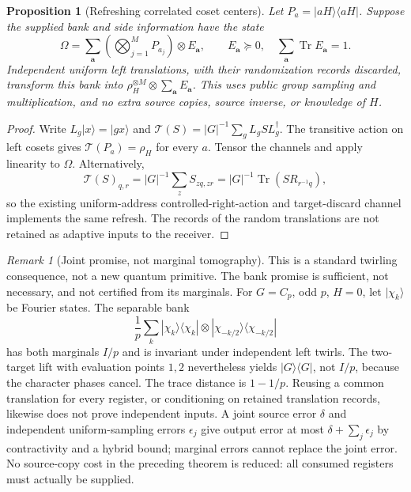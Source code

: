 \documentclass[11pt]{article}
\newtheorem{proposition}[theorem]{Proposition}
\theoremstyle{remark}
\newtheorem{remark}[theorem]{Remark}
\newcommand{\tr}{\operatorname{Tr}}
\begin{document}
\begin{proposition}[Refreshing correlated coset centers]
Let $P_a=|aH\rangle\langle aH|$. Suppose the supplied bank and side
information have the state
\[
 \Omega=\sum_{\mathbf a}\left(\bigotimes_{j=1}^M P_{a_j}\right)
               \otimes E_{\mathbf a},\qquad
 E_{\mathbf a}\succeq0,\quad\sum_{\mathbf a}\tr E_{\mathbf a}=1.
\]
Independent uniform left translations, with their randomization records
discarded, transform this bank into
$\rho_H^{\otimes M}\otimes\sum_{\mathbf a}E_{\mathbf a}$.
This uses public group sampling and multiplication, and no extra source
copies, source inverse, or knowledge of $H$.
\end{proposition}
\begin{proof}
Write $L_g|x\rangle=|gx\rangle$ and
$\mathcal T(S)=|G|^{-1}\sum_gL_gSL_g^\dagger$.
The transitive action on left cosets gives $\mathcal T(P_a)=\rho_H$
for every $a$. Tensor the channels and apply linearity to $\Omega$.
Alternatively,
\[
 \mathcal T(S)_{q,r}=|G|^{-1}\sum_z S_{zq,zr}
     =|G|^{-1}\tr(SR_{r^{-1}q}),
\]
so the existing uniform-address controlled-right-action and target-discard
channel implements the same refresh. The records of the random translations
are not retained as adaptive inputs to the receiver.
\end{proof}

\begin{remark}[Joint promise, not marginal tomography]
This is a standard twirling consequence, not a new quantum primitive.
The bank promise is sufficient, not necessary, and not certified from its
marginals. For $G=C_p$, odd $p$, $H=0$, let $|\chi_k\rangle$ be Fourier
states. The separable bank
\[
 \frac1p\sum_k |\chi_k\rangle\langle\chi_k|
       \otimes|\chi_{-k/2}\rangle\langle\chi_{-k/2}|
\]
has both marginals $I/p$ and is invariant under independent left twirls.
The two-target lift with evaluation points $1,2$ nevertheless yields
$|G\rangle\langle G|$, not $I/p$, because the character phases cancel.
The trace distance is $1-1/p$. Reusing a common translation for every
register, or conditioning on retained translation records, likewise does
not prove independent inputs. A joint source error $\delta$ and independent
uniform-sampling errors $\epsilon_j$ give output error at most
$\delta+\sum_j\epsilon_j$ by contractivity and a hybrid bound; marginal
errors cannot replace the joint error. No source-copy cost in the preceding
theorem is reduced: all consumed registers must actually be supplied.
\end{remark}
\end{document}
